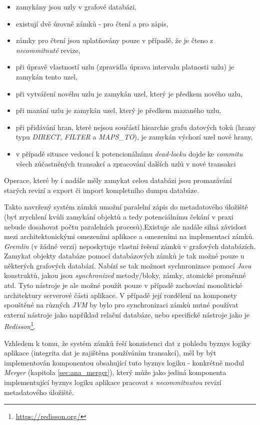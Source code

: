 \begin{itemize}
   \item zamykány jsou uzly v grafové databázi,
   \item existují dvě úrovně zámků - pro čtení a pro zápis,
   \item zámky pro čtení jsou uplatňovány pouze v případě, že je čteno z \textit{necommitnuté} revize,
   \item při úpravě vlastností uzlu (zpravidla úprava intervalu platnosti uzlu) je zamykán tento uzel,
   \item při vytváření novéhu uzlu je zamykán uzel, který je předkem nového uzlu,
   \item při mazání uzlu je zamykán uzel, který je předkem mazaného uzlu,
   \item při přidávání hran, které nejsou součástí hiearchie grafu datových toků (hrany typu \textit{DIRECT}, \textit{FILTER} a \textit{MAPS\_TO}), je zamykán výchozí uzel nové hrany,
   \item v případě situace vedoucí k potencionálnímu \textit{dead-locku} dojde ke \textit{commitu} všech zůčastněných transakcí a zpracování dalších uzlů v nové transakci
\end{itemize}

Operace, které by i nadále měly zamykat celou databázi jsou promazávání starých revizí a export či import kompletního dumpu databáze.

Takto navržený systém zámků umožní paralelní zápis do metadatového úložiště (byť zrychlení kvůli zamykání objektů a tedy potenciálnímu čekání v praxi nebude dosahovat počtu paralelních procesů).Existuje ale nadále silná závislost mezi architektonickými omezeními aplikace a omezeními na implementaci zámků. \textit{Gremlin} (v žádné verzi) neposkytuje vlastní řešení zámků v grafových databázích. Zamykat objekty databáze pomocí databázových zámků je tak možné pouze u některých grafových databází. Nabízí se tak možnost sychnronizace pomocí \textit{Java} konstruktů, jakou jsou \textit{synchronized} metody/bloky, zámky, atomické proměnné atd. Tyto nástroje je ale možné použít pouze v případě zachování monolitické architektury serverové části aplikace. V případě její rozdělení na  komponety spouštěné na různých \textit{JVM} by bylo pro synchronizaci zámků nutné používat externí nástroje jako například relační databáze, nebo specifické nástroje jako je \textit{Redisson}\footnote{\url{https://redisson.org/}}.

Vzhledem k tomu, že systém zámků řeší konzistenci dat z pohledu byznys logiky aplikace (integrita dat je zajištěna používáním transakcí), měl by být implementován komponentou obsahující tuto byznys logiku - konkrétně modul \textit{Merger} (kapitola \ref{sec:ana_merger}), který může jako jediná komponenta implementující byznys logiku aplikace pracovat s \textit{necommitnutou} revizí metadatového úložiště.

